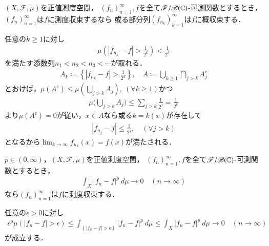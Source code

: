 		\begin{screen}
			\begin{thm}[測度収束列の概収束部分列]
				$(X,\mathscr{F},\mu)$を正値測度空間，
				$(f_n)_{n=1}^\infty,f$を全て$\mathscr{F}/\mathscr{B}(\mathbb{C})$-可測関数とするとき，
				$(f_n)_{n=1}^\infty$は$f$に測度収束するなら
				或る部分列$(f_{n_k})_{k=1}^\infty$は$f$に概収束する．
			\end{thm}
		\end{screen}
		
		\begin{prf}
			任意の$k \geq 1$に対し
			\begin{align}
				\mu\left( |f_{n_k} - f| > \frac{1}{2^k}\right) < \frac{1}{2^k}
			\end{align}
			を満たす添数列$n_1 < n_2 < n_3 < \cdots$が取れる．
			\begin{align}
				A_k \coloneqq \left\{|f_{n_k} - f| > \frac{1}{2^k}\right\},
				\quad A \coloneqq \bigcup_{k\geq1} \bigcap_{j>k} A_j^c
			\end{align}
			とおけば，$\mu(A^c) \leq \mu\left(\bigcup_{j>k} A_j\right),\ (\forall k \geq 1)$かつ
			\begin{align}
				\mu\Biggl(\bigcup_{j>k} A_j\Biggr) \leq \sum_{j>k} \frac{1}{2^j}
				= \frac{1}{2^k}
			\end{align}
			より$\mu(A^c) = 0$が従い，$x \in A$なら或る$k = k(x)$が存在して
			\begin{align}
				|f_{n_j} - f| \leq \frac{1}{2^j}, \quad (\forall j > k)
			\end{align}
			となるから$\lim_{k \to \infty} f_{n_k}(x) = f(x)$が満たされる．
			\QED
		\end{prf}
		
		\begin{screen}
			\begin{thm}[平均収束すれば測度収束する]
				$p \in (0,\infty)$，$(X,\mathscr{F},\mu)$を正値測度空間，
				$(f_n)_{n=1}^\infty,f$を全て$\mathscr{F}/\mathscr{B}(\mathbb{C})$-可測関数とするとき，
				\begin{align}
					\int_X |f_n - f|^p\ d\mu \longrightarrow 0
					\quad (n \longrightarrow \infty)
				\end{align}
				なら$(f_n)_{n=1}^\infty$は$f$に測度収束する．
			\end{thm}
		\end{screen}
		
		\begin{prf}
			任意の$\epsilon > 0$に対し
			\begin{align}
				\epsilon^p \mu\left(|f_n - f| > \epsilon\right)
				\leq \int_{\left\{|f_n - f| > \epsilon\right\}} |f_n-f|^p\ d\mu
				\leq \int_X |f_n - f|^p\ d\mu \longrightarrow 0
				\quad (n \longrightarrow \infty)
			\end{align}
			が成立する．
			\QED
		\end{prf}
		
